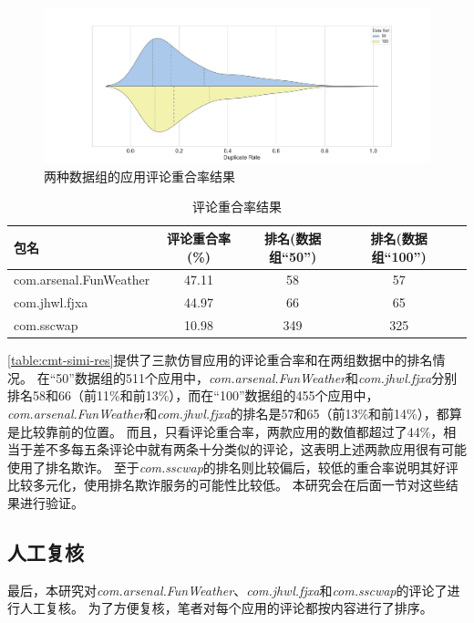 \begin{figure}[htbp]
	\centering
	\includegraphics[width=\textwidth]{./Figures/edwin-cmt-simi-dist.png}
    \caption{两种数据组的应用评论重合率结果}
    \label{fig:cmt_simi}
\end{figure}

\begin{table}[htbp]
	\renewcommand{\arraystretch}{1}
	\small
	\centering
	\caption{评论重合率结果}
	\vspace{1mm}
	\begin{tabular}{lcccc}
		\toprule
		包名 & 评论重合率(\%) & 排名(数据组``50'') & 排名(数据组``100'') \\
		\midrule
		com.arsenal.FunWeather & 47.11 & 58 & 57 \\
		\rowcolor{gray!15} com.jhwl.fjxa & 44.97 & 66 & 65 \\
		com.sscwap & 10.98 & 349 & 325 \\
		\bottomrule
	\end{tabular}
	\label{table:cmt-simi-res}
\end{table}

\autoref{table:cmt-simi-res}提供了三款仿冒应用的评论重合率和在两组数据中的排名情况。
在``50''数据组的511个应用中，\emph{com.arsenal.FunWeather}和\emph{com.jhwl.fjxa}分别排名58和66（前11\%和前13\%），而在``100''数据组的455个应用中，\emph{com.arsenal.FunWeather}和\emph{com.jhwl.fjxa}的排名是57和65（前13\%和前14\%），都算是比较靠前的位置。
而且，只看评论重合率，两款应用的数值都超过了44\%，相当于差不多每五条评论中就有两条十分类似的评论，这表明上述两款应用很有可能使用了排名欺诈。
至于\emph{com.sscwap}的排名则比较偏后，较低的重合率说明其好评比较多元化，使用排名欺诈服务的可能性比较低。
本研究会在后面一节对这些结果进行验证。

\subsection{人工复核}

最后，本研究对\emph{com.arsenal.FunWeather}、\emph{com.jhwl.fjxa}和\emph{com.sscwap}的评论了进行人工复核。
为了方便复核，笔者对每个应用的评论都按内容进行了排序。

